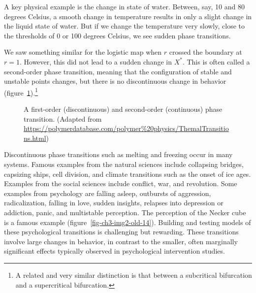 \documentclass[
  a4paper,
  DIV=11,
  numbers=noendperiod,
  oneside]{scrreprt}
\begin{document}
A key physical example is the change in state of water. Between, say, 10
and 80 degrees Celsius, a smooth change in temperature results in only a
slight change in the liquid state of water. But if we change the
temperature very slowly, close to the thresholds of 0 or 100 degrees
Celsius, we see sudden phase transitions.

We saw something similar for the logistic map when \(r\) crossed the
boundary at \(r = 1\). However, this did not lead to a sudden change in
\(X^{*}\). This is often called a second-order phase transition, meaning
that the configuration of stable and unstable points changes, but there
is no discontinuous change in behavior
(figure~\ref{fig-ch3-img1-old-13}).\footnote{A related and very similar
  distinction is that between a subcritical bifurcation and a
  supercritical bifurcation.}

\begin{figure}


\caption{\label{fig-ch3-img1-old-13}A first-order (discontinuous) and
second-order (continuous) phase transition. (Adapted from
\url{https://polymerdatabase.com/polymer\%20physics/ThemalTransitions.html})}

\end{figure}%

Discontinuous phase transitions such as melting and freezing occur in
many systems. Famous examples from the natural sciences include
collapsing bridges, capsizing ships, cell division, and climate
transitions such as the onset of ice ages. Examples from the social
sciences include conflict, war, and revolution. Some examples from
psychology are falling asleep, outbursts of aggression, radicalization,
falling in love, sudden insights, relapses into depression or addiction,
panic, and multistable perception. The perception of the Necker cube is
a famous example (figure~\ref{fig-ch3-img2-old-14}). Building and
testing models of these psychological transitions is challenging but
rewarding. These transitions involve large changes in behavior, in
contrast to the smaller, often marginally significant effects typically
observed in psychological intervention studies.
\end{document}
